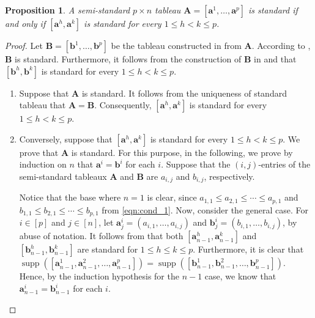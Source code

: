 \documentclass[11pt,a4paper,reqno,dvipsnames]{amsart}
\theoremstyle{plain}
\newtheorem{Proposition}[Theorem]{Proposition}
\theoremstyle{definition}
\newtheorem{Assumptions and Discussion}[Theorem]{Assumptions and Discussion}
\theoremstyle{remark}
\def\supp{\operatorname{supp}}
\newcommand\bda{{\bm a}}
\newcommand\bdb{{\bm b}}
\newcommand\bfA{\mathbf{A}}
\newcommand\bfB{\mathbf{B}}
\begin{document}
\begin{Proposition}
    \label{StandardExist}
     A semi-standard $p\times n$ tableau $\bfA=[\bda^1,\dots,\bda^p]$ is standard if and only if $[\bda^h, \bda^{k}]$ is standard for every $1 \leq h < k \leq p$.
\end{Proposition}
\begin{proof}
    Let $\bfB=[\bdb^1, \ldots, \bdb^{p}]$ be the tableau constructed in  from $\bfA$. According to , $\bfB$ is standard. Furthermore, it follows from the construction of $\bfB$ in  and  that $[\bdb^h, \bdb^{k}]$ is standard for every $1 \leq h < k \leq p$.
    \begin{enumerate}[a]
        \item Suppose that $\bfA$ is standard. It follows from the uniqueness of standard tableau that $\bfA=\bfB$. Consequently, $[\bda^h, \bda^{k}]$ is standard for every $1 \leq h < k \leq p$.

        \item Conversely, suppose that $[\bda^h, \bda^{k}]$ is standard for every $1 \leq h < k \leq p$. We prove that $\bfA$ is standard. For this purpose, in the following, we prove by induction on $n$ that $\bda^i=\bdb^i$ for each $i$.  Suppose that the $(i,j)$-entries of the semi-standard tableaux $\bfA$ and $\bfB$ are $a_{i,j}$ and $b_{i,j}$, respectively.

            Notice that the base where $n=1$ is clear, since $a_{1,1}\le a_{2,1}\le \cdots\le a_{p,1}$ and $b_{1,1}\le b_{2,1}\le \cdots \le b_{p,1}$
            from \eqref{eqn:cond_1}.
            Now, consider the general case. For 
            $i\in [p]$ and $j\in [n]$,
            let ${\bda}^i_{j}=({a}_{i,1},\dots,{a}_{i,j})$ and $\bdb^i_{j}=(b_{i,1},\dots,b_{i,j})$, by abuse of notation. It follows from  that both $[\bda^h_{n-1},\bda^k_{n-1}]$ and $[\bdb^h_{n-1},\bdb^k_{n-1}]$ are standard for $1\le h \le k \le p$. Furthermore, it is clear that $\supp([\bda^1_{n-1},\bda^2_{n-1},\dots,\bda^p_{n-1}])= \supp([\bdb^1_{n-1},\bdb^2_{n-1},\dots,\bdb^{p}_{n-1}])$. Hence, by the induction hypothesis for the $n-1$ case, we know that $\bda^i_{n-1}=\bdb^i_{n-1}$ for each $i$.


\end{enumerate}
\end{proof}
\end{document}
